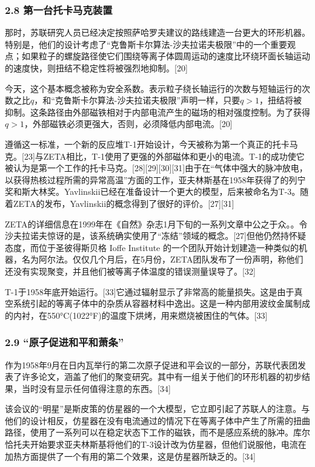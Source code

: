 \subsubsection{2.8 第一台托卡马克装置}
那时，苏联研究人员已经决定按照萨哈罗夫建议的路线建造一台更大的环形机器。特别是，他们的设计考虑了“克鲁斯卡尔算法-沙夫拉诺夫极限”中的一个重要观点；如果粒子的螺旋路径使它们围绕等离子体圆周运动的速度比环绕环面长轴运动的速度快，则扭结不稳定性将被强烈地抑制。[20]

今天，这个基本概念被称为安全系数。表示粒子绕长轴运行的次数与短轴运行的次数之比$q$，和“克鲁斯卡尔算法-沙夫拉诺夫极限”声明一样，只要$q>1$，扭结将被抑制。这条路径由外部磁铁相对于内部电流产生的磁场的相对强度控制。为了获得$q>1$，外部磁铁必须更强大，否则，必须降低内部电流。[20]

遵循这一标准，一个新的反应堆T-1开始设计，今天被称为第一个真正的托卡马克。[23]与ZETA相比，T-1使用了更强的外部磁体和更小的电流。T-1的成功使它被认为是第一个工作的托卡马克。[28][29][30][31]由于在“气体中强大的脉冲放电，以获得热核过程所需的异常高温”方面的工作，亚夫林斯基在1958年获得了的列宁奖和斯大林奖。Yavlinskii已经在准备设计一个更大的模型，后来被命名为T-3。随着ZETA的发布，Yavlinskii的概念得到了很好的评价。[27][31]

ZETA的详细信息在1999年在《自然》杂志1月下旬的一系列文章中公之于众。。令沙夫拉诺夫惊讶的是，该系统确实使用了“冻结”领域的概念。[27]但他仍然持怀疑态度，而位于圣彼得斯贝格 Ioffe Institute 的一个团队开始计划建造一种类似的机器，名为阿尔法。仅仅几个月后，在5月份，ZETA团队发布了一份声明，称他们还没有实现聚变，并且他们被等离子体温度的错误测量误导了。[32]

T-1于1958年底开始运行。[33]它通过辐射显示了非常高的能量损失。这是由于真空系统引起的等离子体中的杂质从容器材料中逸出。这是一种内部用波纹金属制成的内衬，在550°C(1022°F)的温度下烘烤，用来燃烧被困住的气体。[33]
\subsubsection{2.9 “原子促进和平和萧条”}
作为1958年9月在日内瓦举行的第二次原子促进和平会议的一部分，苏联代表团发表了许多论文，涵盖了他们的聚变研究。其中有一组关于他们的环形机器的初步结果，当时没有显示任何值得注意的东西。[34]

该会议的“明星”是斯皮策的仿星器的一个大模型，它立即引起了苏联人的注意。与他们的设计相反，仿星器在没有电流通过的情况下在等离子体中产生了所需的扭曲路径，使用了一系列可以在稳定状态下工作的磁铁，而不是感应系统的脉冲。库尔恰托夫开始要求亚夫林斯基将他们的T-3设计改为仿星器，但他们说服他，电流在加热方面提供了一个有用的第二个效果，这是仿星器所缺乏的。[34]

